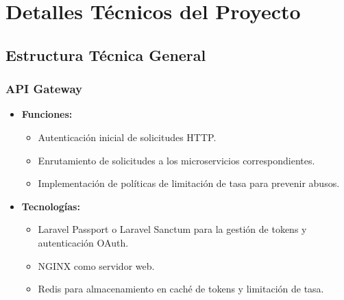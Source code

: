 \documentclass{article}
\begin{document}
\newpage

\section{Detalles Técnicos del Proyecto}

\subsection{Estructura Técnica General}

\subsubsection{API Gateway}
\begin{itemize}
    \item \textbf{Funciones:}
          \begin{itemize}
              \item Autenticación inicial de solicitudes HTTP.
              \item Enrutamiento de solicitudes a los microservicios correspondientes.
              \item Implementación de políticas de limitación de tasa para prevenir abusos.
          \end{itemize}
    \item \textbf{Tecnologías:}
          \begin{itemize}
              \item Laravel Passport o Laravel Sanctum para la gestión de tokens y autenticación OAuth.
              \item NGINX como servidor web.
              \item Redis para almacenamiento en caché de tokens y limitación de tasa.
          \end{itemize}
\end{itemize}
\end{document}
